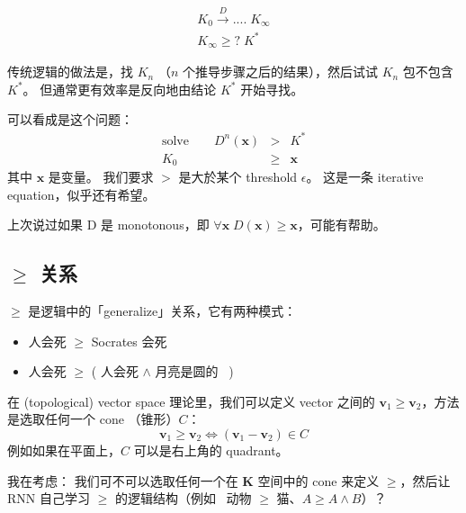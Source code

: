 \documentclass[12pt]{article}
\begin{document}
\begin{eqnarray}
K_0 \stackrel{D}{\longrightarrow} .... \; K_\infty \nonumber \\
K_\infty \ge ? \; K^*
\end{eqnarray}

传统逻辑的做法是，找 $K_n$ （$n$ 个推导步骤之后的结果），然后试试 $K_n$ 包不包含 $K^*$。 但通常更有效率是反向地由结论 $K^*$ 开始寻找。

可以看成是这个问题：
\begin{eqnarray}
\mbox{solve}\quad\quad D^n(\mathbf{x}) & > & K^* \nonumber \\
K_0 & \ge & \mathbf{x}
\end{eqnarray}
其中 $\mathbf{x}$ 是变量。 我们要求 $>$ 是大於某个 threshold $\epsilon$。  这是一条 iterative equation，似乎还有希望。

上次说过如果 D 是 monotonous，即 $\forall \mathbf{x} \; D(\mathbf{x}) \ge \mathbf{x}$，可能有帮助。

\subsection{\texorpdfstring{$\ge$}{>} 关系}

$\ge$ 是逻辑中的「generalize」关系，它有两种模式：
\begin{itemize}
\item 人会死 $\ge$ Socrates 会死
\item 人会死 $\ge$ ( 人会死 $\wedge$ 月亮是圆的 ~)
\end{itemize}

在 (topological) vector space 理论里，我们可以定义 vector 之间的 $\mathbf{v}_1 \ge \mathbf{v}_2$，方法是选取任何一个 cone （锥形）$C$：
$$ \mathbf{v}_1 \ge \mathbf{v}_2 \Leftrightarrow (\mathbf{v}_1 - \mathbf{v}_2) \in C $$
例如如果在平面上，$C$ 可以是右上角的 quadrant。

我在考虑： 我们可不可以选取任何一个在 $\mathbf{K}$ 空间中的 cone 来定义 $\ge$，然后让 RNN 自己学习 $\ge$ 的逻辑结构（例如~ 动物 $\ge $ 猫、$A \ge A \wedge B$）？
\end{document}
